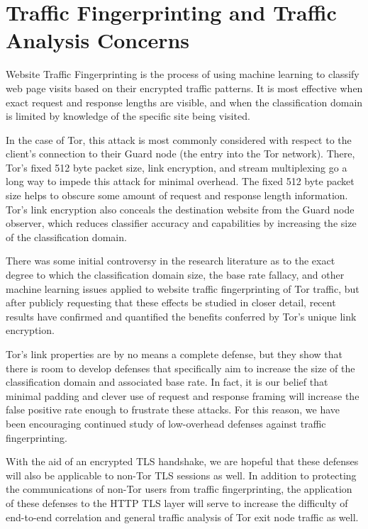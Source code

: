 \documentclass[letterpaper,11pt]{llncs}
\begin{document}
\section{Traffic Fingerprinting and Traffic Analysis Concerns}

Website Traffic Fingerprinting is the process of using machine learning to
classify web page visits based on their encrypted traffic patterns. It is most
effective when exact request and response lengths are visible, and when the
classification domain is limited by knowledge of the specific site being
visited.

In the case of Tor, this attack is most commonly considered with respect to
the client's connection to their Guard node (the entry into the Tor network).
There, Tor's fixed 512 byte packet size, link encryption, and stream
multiplexing go a long way to impede this attack for minimal overhead. The
fixed 512 byte packet size helps to obscure some amount of request and
response length information. Tor's link encryption also conceals the
destination website from the Guard node observer, which reduces classifier
accuracy and capabilities by increasing the size of the classification domain.

There was some initial controversy in the research literature as to the exact
degree to which the classification domain size, the base rate fallacy, and
other machine learning issues applied to website traffic fingerprinting of Tor
traffic, but after publicly requesting that these effects be studied in closer
detail, recent results have confirmed and quantified the benefits conferred by
Tor's unique link encryption.

Tor's link properties are by no means a complete defense, but they show that
there is room to develop defenses that specifically aim to increase the size
of the classification domain and associated base rate. In fact, it is our
belief that minimal padding and clever use of request and response framing
will increase the false positive rate enough to frustrate these attacks. For
this reason, we have been encouraging continued study of low-overhead defenses
against traffic fingerprinting. 

With the aid of an encrypted TLS handshake, we are hopeful that these defenses
will also be applicable to non-Tor TLS sessions as well. In addition to
protecting the communications of non-Tor users from traffic fingerprinting,
the application of these defenses to the HTTP TLS layer will serve to increase
the difficulty of end-to-end correlation and general traffic analysis of Tor
exit node traffic as well.
\end{document}
